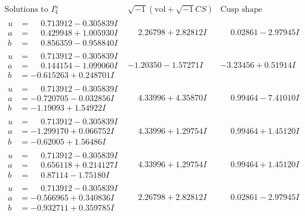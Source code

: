 \documentclass[1p]{elsarticle_modified}
\theoremstyle{definition}
\newcommand{\I}{\sqrt{-1}}
\begin{document}
$$\begin{array}{c|c|c}
\text{Solutions to }I^u_{4}& \I (\text{vol} + \sqrt{-1}CS) & \text{Cusp shape}\\
 \hline 
\begin{aligned}
u &= \phantom{-}0.713912 - 0.305839 I \\
a &= \phantom{-}0.429948 + 1.005930 I \\
b &= \phantom{-}0.856359 - 0.958840 I\end{aligned}
 & \phantom{-}2.26798 + 2.82812 I & \phantom{-}0.02861 - 2.97945 I \\ \hline\begin{aligned}
u &= \phantom{-}0.713912 - 0.305839 I \\
a &= \phantom{-}0.144154 - 1.099060 I \\
b &= -0.615263 + 0.248701 I\end{aligned}
 & -1.20350 - 1.57271 I & -3.23456 + 0.51914 I \\ \hline\begin{aligned}
u &= \phantom{-}0.713912 - 0.305839 I \\
a &= -0.720705 - 0.032856 I \\
b &= -1.19093 + 1.54922 I\end{aligned}
 & \phantom{-}4.33996 + 4.35870 I & \phantom{-}0.99464 - 7.41010 I \\ \hline\begin{aligned}
u &= \phantom{-}0.713912 - 0.305839 I \\
a &= -1.299170 + 0.066752 I \\
b &= -0.62005 + 1.56486 I\end{aligned}
 & \phantom{-}4.33996 + 1.29754 I & \phantom{-}0.99464 + 1.45120 I \\ \hline\begin{aligned}
u &= \phantom{-}0.713912 - 0.305839 I \\
a &= \phantom{-}0.656118 + 0.214127 I \\
b &= \phantom{-}0.87114 - 1.75180 I\end{aligned}
 & \phantom{-}4.33996 + 1.29754 I & \phantom{-}0.99464 + 1.45120 I \\ \hline\begin{aligned}
u &= \phantom{-}0.713912 - 0.305839 I \\
a &= -0.566965 + 0.340836 I \\
b &= -0.932711 + 0.359785 I\end{aligned}
 & \phantom{-}2.26798 + 2.82812 I & \phantom{-}0.02861 - 2.97945 I \\ \hline\begin{aligned}

\end{aligned}
\end{array}$$
\end{document}
